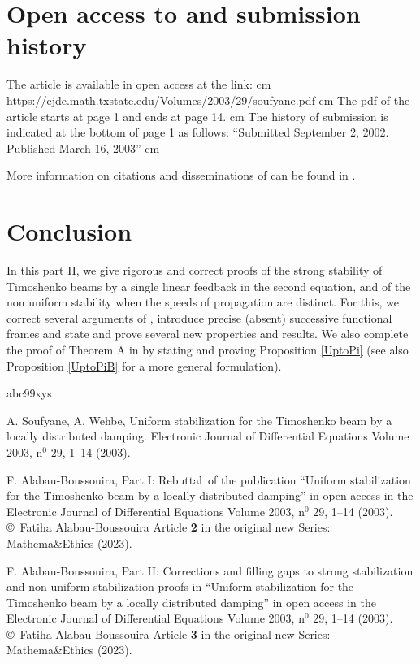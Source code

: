 \documentclass[10pt, english]{article}
\begin{document}
{\section{Open access to \cite{SW2003} and submission history}

The article \cite{SW2003} is available in open access at the link: 
 cm
\url{https://ejde.math.txstate.edu/Volumes/2003/29/soufyane.pdf}
 cm
The pdf of the article starts at page 1 and ends at page 14.
 cm
The history of submission is indicated at the bottom of page 1 as follows:
\vskip 0.2cm 
\enquote{Submitted September 2, 2002. Published March 16, 2003}
 cm

More information on citations and disseminations of \cite{SW2003} can be found in \cite{AB2023I}.

\section{Conclusion}
In this part II, we give rigorous and correct proofs of the strong stability of Timoshenko beams by a single linear feedback in the second equation, and of the non uniform stability when the speeds of propagation are distinct. For this, we correct several arguments of \cite{SW2003}, introduce precise (absent) successive functional frames and state and prove several new properties and results. We also complete the proof of Theorem A in \cite{NRL1986} by stating and proving Proposition \ref{UptoPi} (see also Proposition \ref{UptoPiB} for a more general formulation).

\begin{thebibliography}{abc99xys}

 A. Soufyane, A. Wehbe, Uniform stabilization for the Timoshenko beam by a locally distributed damping. Electronic Journal of Differential Equations Volume 2003, n$^0$  $29$, 1--14 (2003).

 F. Alabau-Boussouira, Part I: Rebuttal\, of the publication \enquote{Uniform stabilization for the Timoshenko beam by a locally distributed damping}  in open access in the Electronic Journal of Differential Equations Volume 2003, n$^0$  $29$, 1--14 (2003).  \copyright{\ Fatiha Alabau-Boussouira Article {\bf 2} in the original new Series: Mathema\&Ethics} (2023).

 F. Alabau-Boussouira, Part II: Corrections and filling gaps to strong stabilization and non-uniform stabilization proofs in \enquote{Uniform stabilization for the Timoshenko beam by a locally distributed damping}  in open access in the Electronic Journal of Differential Equations Volume 2003, n$^0$  $29$, 1--14 (2003).  \copyright{\ Fatiha Alabau-Boussouira Article {\bf 3} in the original new Series: Mathema\&Ethics} (2023).


\end{thebibliography}}
\end{document}
